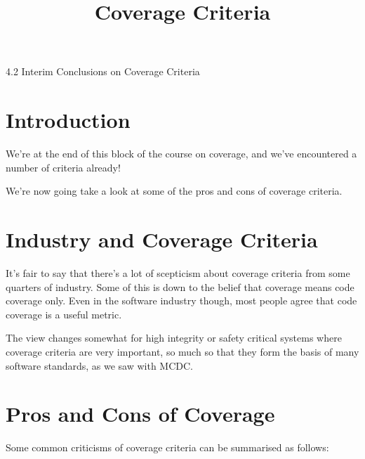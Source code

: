 



\title{Coverage Criteria}{4.2 Interim Conclusions on Coverage Criteria}

\section{Introduction}

We're at the end of this block of the course on coverage, and we've encountered
a number of criteria already! 

We're now going take a look at some of the pros and cons of coverage criteria.

\section{Industry and Coverage Criteria}

It's fair to say that there's a lot of scepticism about coverage criteria from some
quarters of industry. Some of this is down to the belief that coverage means
code coverage only. Even in the software industry though, most people agree that
code coverage is a useful metric.

The view changes somewhat for high integrity or safety critical systems where
coverage criteria are very important, so much so that they form the basis of
many software standards, as we saw with MCDC.

\section{Pros and Cons of Coverage}

Some common criticisms of coverage criteria can be summarised as follows:

